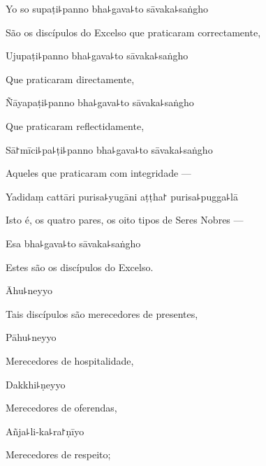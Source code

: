 Yo so supaṭi꜕panno bha꜕gava꜕to sāvaka꜕saṅgho

\begin{english}
  São os discípulos do Excelso que praticaram correctamente,
\end{english}

Ujupaṭi꜕panno bha꜕gava꜕to sāvaka꜕saṅgho

\begin{english}
  Que praticaram directamente,
\end{english}

Ñāyapaṭi꜕panno bha꜕gava꜕to sāvaka꜕saṅgho

\begin{english}
  Que praticaram reflectidamente,
\end{english}

Sā꜓mīci꜕pa꜕ṭi꜕panno bha꜕gava꜕to sāvaka꜕saṅgho

\begin{english}
  Aqueles que praticaram com integridade ---
\end{english}

Yadidaṃ cattāri purisa꜕yugāni aṭṭha꜓ purisa꜕pugga꜕lā

\begin{english}
  Isto é, os quatro pares, os oito tipos de Seres Nobres ---
\end{english}

Esa bha꜕gava꜕to sāvaka꜕saṅgho

\begin{english}
 Estes são os discípulos do Excelso.
\end{english}

Āhu꜕neyyo

\begin{english}
  Tais discípulos são merecedores de presentes,
\end{english}

Pāhu꜕neyyo

\begin{english}
  Merecedores de hospitalidade,
\end{english}

\clearpage

Dakkhi꜕ṇeyyo

\begin{english}
  Merecedores de oferendas,
\end{english}

Añja꜕li-ka꜕ra꜓ṇīyo

\begin{english}
  Merecedores de respeito;
\end{english}

